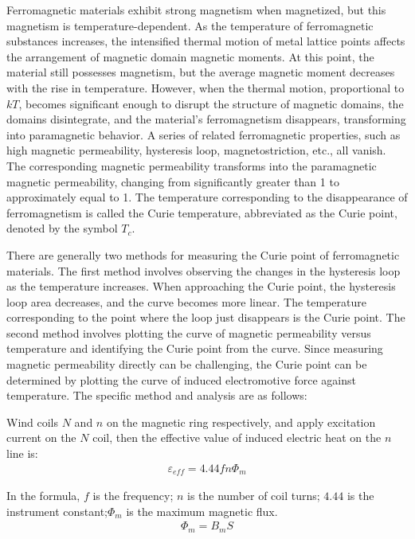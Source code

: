 \documentclass[UTF8]{article}
\begin{document}
      Ferromagnetic materials exhibit strong magnetism when magnetized, but this magnetism is temperature-dependent. As the temperature of ferromagnetic substances increases, the intensified thermal motion of metal lattice points affects the arrangement of magnetic domain magnetic moments. At this point, the material still possesses magnetism, but the average magnetic moment decreases with the rise in temperature. However, when the thermal motion, proportional to $kT$, becomes significant enough to disrupt the structure of magnetic domains, the domains disintegrate, and the material's ferromagnetism disappears, transforming into paramagnetic behavior. A series of related ferromagnetic properties, such as high magnetic permeability, hysteresis loop, magnetostriction, etc., all vanish. The corresponding magnetic permeability transforms into the paramagnetic magnetic permeability, changing from significantly greater than 1 to approximately equal to 1. The temperature corresponding to the disappearance of ferromagnetism is called the Curie temperature, abbreviated as the Curie point, denoted by the symbol $T_c$. 
      
      There are generally two methods for measuring the Curie point of ferromagnetic materials. The first method involves observing the changes in the hysteresis loop as the temperature increases. When approaching the Curie point, the hysteresis loop area decreases, and the curve becomes more linear. The temperature corresponding to the point where the loop just disappears is the Curie point. The second method involves plotting the curve of magnetic permeability versus temperature and identifying the Curie point from the curve. Since measuring magnetic permeability directly can be challenging, the Curie point can be determined by plotting the curve of induced electromotive force against temperature. The specific method and analysis are as follows: 
      
      Wind coils $N$ and $n$ on the magnetic ring respectively, and apply excitation current on the $N$ coil, then the effective value of induced electric heat on the $n$ line is:         
      \begin{eqnarray}
      \varepsilon_{eff} = 4.44 fn\Phi_m
      \end{eqnarray}         
      
      In the formula, $f$ is the frequency; $n$ is the number of coil turns; $4.44$ is the instrument constant;$\Phi_m$ is the maximum magnetic flux.   
      \begin{eqnarray}
      \Phi_m = B_m S
      \end{eqnarray}      
      
\end{document}
